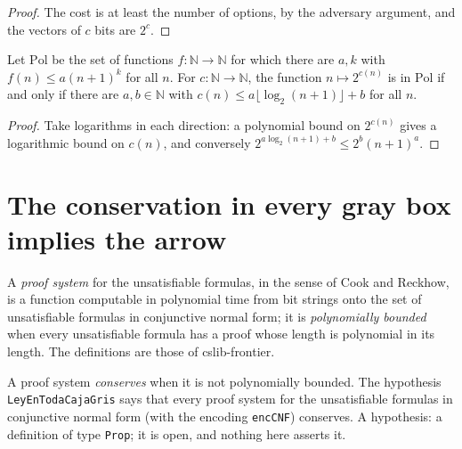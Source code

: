 \begin{proof}
  \leanok
  The cost is at least the number of options, by the adversary argument, and the vectors of $c$ bits
  are $2^c$.
\end{proof}

\begin{theorem}
  \label{thm:arrow-log-choices}
  \leanok
  Let $\mathrm{Pol}$ be the set of functions $f : \mathbb{N} \to \mathbb{N}$ for which there are $a,
  k$ with $f(n) \le a (n + 1)^k$ for all $n$. For $c : \mathbb{N} \to \mathbb{N}$, the function $n
  \mapsto 2^{c(n)}$ is in $\mathrm{Pol}$ if and only if there are $a, b \in \mathbb{N}$ with $c(n) \le
  a \lfloor \log_2 (n + 1) \rfloor + b$ for all $n$.
  \own{}
\end{theorem}

\begin{proof}
  \leanok
  Take logarithms in each direction: a polynomial bound on $2^{c(n)}$ gives a logarithmic bound on
  $c(n)$, and conversely $2^{a \log_2 (n+1) + b} \le 2^b (n+1)^a$.
\end{proof}

\section{The conservation in every gray box implies the arrow}
\label{sec:arrow-gray-box}

A \emph{proof system} for the unsatisfiable formulas, in the sense of Cook and Reckhow, is a function
computable in polynomial time from bit strings onto the set of unsatisfiable formulas in conjunctive
normal form; it is \emph{polynomially bounded} when every unsatisfiable formula has a proof whose
length is polynomial in its length. The definitions are those of cslib-frontier.

\begin{definition}
  \label{def:arrow-gray-box}
  \leanok
  A proof system \emph{conserves} when it is not polynomially bounded. The hypothesis
  \texttt{LeyEnTodaCajaGris} says that every proof system for the unsatisfiable formulas in
  conjunctive normal form (with the encoding \texttt{encCNF}) conserves. A hypothesis: a definition
  of type \texttt{Prop}; it is open, and nothing here asserts it.
  \own{}
\end{definition}

